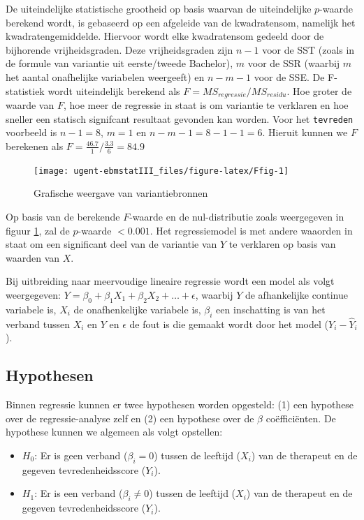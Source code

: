 \documentclass[
]{book}
\providecommand{\tightlist}{%
  \setlength{\itemsep}{0pt}\setlength{\parskip}{0pt}}
\theoremstyle{definition}
\theoremstyle{definition}
\theoremstyle{definition}
\theoremstyle{definition}
\theoremstyle{remark}
\begin{document}
De uiteindelijke statistische grootheid op basis waarvan de uiteindelijke \(p\)-waarde berekend wordt, is gebaseerd op een afgeleide van de kwadratensom, namelijk het kwadratengemiddelde. Hiervoor wordt elke kwadratensom gedeeld door de bijhorende vrijheidsgraden. Deze vrijheidsgraden zijn \(n-1\) voor de SST (zoals in de formule van variantie uit eerste/tweede Bachelor), \(m\) voor de SSR (waarbij \(m\) het aantal onafhelijke variabelen weergeeft) en \(n-m-1\) voor de SSE. De F-statistiek wordt uiteindelijk berekend als \(F = MS_{regressie}/MS_{residu}\). Hoe groter de waarde van \(F\), hoe meer de regressie in staat is om variantie te verklaren en hoe sneller een statisch signifcant resultaat gevonden kan worden. Voor het \texttt{tevreden} voorbeeld is \(n-1 = 8\), \(m = 1\) en \(n-m-1 = 8-1-1 = 6\). Hieruit kunnen we \(F\) berekenen als \(F = \frac{46.7}{1}/\frac{3.3}{6} = 84.9\)

\begin{figure}
\texttt{[image: ugent-ebmstatIII\_files/figure-latex/Ffig-1]} \caption{Grafische weergave van variantiebronnen}\label{fig:Ffig}
\end{figure}

Op basis van de berekende \(F\)-waarde en de nul-distributie zoals weergegeven in figuur \ref{fig:Ffig}, zal de \(p\)-waarde \(< 0.001\). Het regressiemodel is met andere waaorden in staat om een significant deel van de variantie van \(Y\) te verklaren op basis van waarden van \(X\).

Bij uitbreiding naar meervoudige lineaire regressie wordt een model als volgt weergegeven: \(Y = \beta_0 + \beta_1X_1 + \beta_2X_2 + … + \epsilon\), waarbij \(Y\) de afhankelijke continue variabele is, \(X_i\) de onafhenkelijke variabele is, \(\beta_i\) een inschatting is van het verband tussen \(X_i\) en \(Y\) en \(\epsilon\) de fout is die gemaakt wordt door het model (\(Y_i - \hat{Y}_i\)).

\hypertarget{hypothesen}{%
\subsection*{Hypothesen}\label{hypothesen}}


Binnen regressie kunnen er twee hypothesen worden opgesteld: (1) een hypothese over de regressie-analyse zelf en (2) een hypothese over de \(\beta\) coëfficiënten. De hypothese kunnen we algemeen als volgt opstellen:

\begin{itemize}
\tightlist
\item
  \(H_0\): Er is geen verband (\(\beta_i = 0\)) tussen de leeftijd (\(X_i\)) van de therapeut en de gegeven tevredenheidsscore (\(Y_i\)).
\item
  \(H_1\): Er is een verband (\(\beta_i \neq 0\)) tussen de leeftijd (\(X_i\)) van de therapeut en de gegeven tevredenheidsscore (\(Y_i\)).
\end{itemize}
\end{document}
